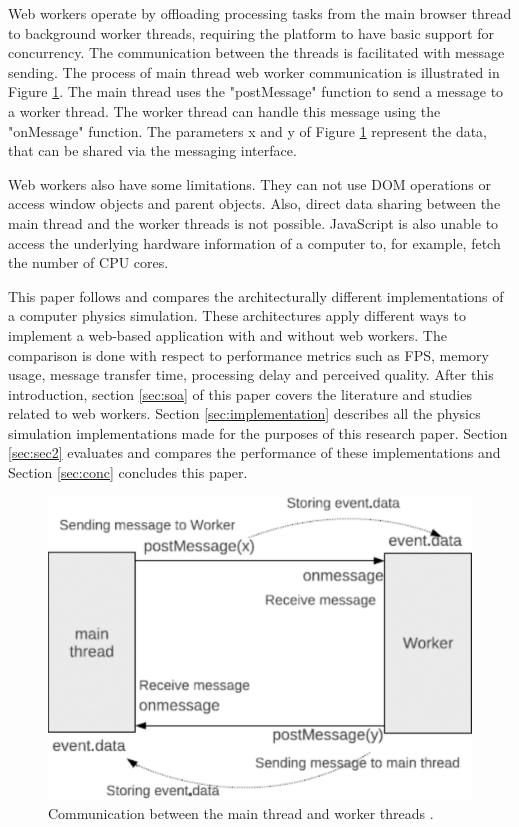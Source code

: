 \documentclass[conference]{IEEEtran}
\begin{document}
Web workers operate by offloading processing tasks from the main browser thread to background worker threads, requiring the platform to have basic support for concurrency. 
The communication between the threads is facilitated with message sending. The process of main thread web worker communication is illustrated in Figure \ref{fig:figure1}. 
The main thread uses the "postMessage" function to send a message to a worker thread. The worker thread can handle this message using the "onMessage" function. The parameters x and y of Figure \ref{fig:figure1} represent the data, that can be shared via the messaging interface. \cite{doha, watanabe}

Web workers also have some limitations. They can not use DOM operations or access window objects and parent objects. Also, direct data sharing between the main thread and 
the worker threads is not possible. JavaScript is also unable to access the underlying hardware information of a computer to, for example, fetch the number of CPU cores. \cite{watanabe, verdu}

This paper follows and compares the architecturally different implementations of a computer physics simulation. These architectures apply different ways to implement a 
web-based application with and without web workers. The comparison is done with respect to performance metrics such as FPS, memory usage, message transfer time, processing delay and 
perceived quality. After this introduction, section \ref{sec:soa} of this paper covers the literature and studies related to web workers. Section \ref{sec:implementation} describes all the
physics simulation implementations made for the purposes of this research paper. Section \ref{sec:sec2} evaluates and compares the performance of these implementations and
Section \ref{sec:conc} concludes this paper.

\begin{figure}[ht]
	\centering
	\includegraphics[scale=0.25]{figs/figure1.png}
	\caption{Communication between the main thread and worker threads \cite{watanabe}.}
	\label{fig:figure1}
\end{figure}
\end{document}
